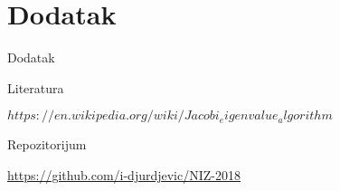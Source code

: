 \documentclass[serbian]{beamer}
\begin{document}
\section{Dodatak}

\begin{frame}{Dodatak}

\begin{flushleft}
	{\Large Literatura}
\end{flushleft}

\texttt{$https://en.wikipedia.org/wiki/Jacobi_eigenvalue_algorithm$}

\begin{flushleft}
	{\Large Repozitorijum}
\end{flushleft}

\href{https://github.com/i-djurdjevic/NIZ-2018}{https://github.com/i-djurdjevic/NIZ-2018}

\end{frame}
\end{document}
